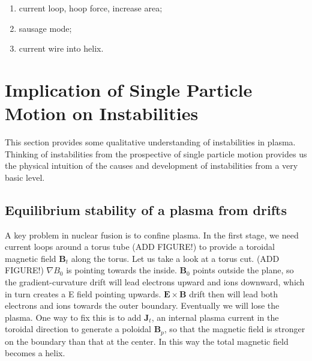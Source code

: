 \documentclass[
  notoc %
]{tufte-book}
\providecommand{\tightlist}{%
  \setlength{\itemsep}{0pt}\setlength{\parskip}{0pt}
}
\begin{document}
\begin{enumerate}
\def\labelenumi{\arabic{enumi}.}
\tightlist
\item
  current loop, hoop force, increase area;
\item
  sausage mode;
\item
  current wire into helix.
\end{enumerate}

\hypertarget{sec:particle_motion_instability}{%
\section{Implication of Single Particle Motion on
Instabilities}\label{sec:particle_motion_instability}}

This section provides some qualitative understanding of instabilities in
plasma. Thinking of instabilities from the prospective of single
particle motion provides us the physical intuition of the causes and
development of instabilities from a very basic level.

\hypertarget{equilibrium-stability-of-a-plasma-from-drifts}{%
\subsection{Equilibrium stability of a plasma from
drifts}\label{equilibrium-stability-of-a-plasma-from-drifts}}

A key problem in nuclear fusion is to confine plasma. In the first
stage, we need current loops around a torus tube (ADD FIGURE!) to
provide a toroidal magnetic field \(\mathbf{B}_t\) along the torus. Let
us take a look at a torus cut. (ADD FIGURE!) \(\nabla B_0\) is pointing
towards the inside. \(\mathbf{B}_0\) points outside the plane, so the
gradient-curvature drift will lead electrons upward and ions downward,
which in turn creates a E field pointing upwards.
\(\mathbf{E}\times\mathbf{B}\) drift then will lead both electrons and
ions towards the outer boundary. Eventually we will lose the plasma. One
way to fix this is to add \(\mathbf{J}_t\), an internal plasma current
in the toroidal direction to generate a poloidal \(\mathbf{B}_p\), so
that the magnetic field is stronger on the boundary than that at the
center. In this way the total magnetic field becomes a helix.
\end{document}
